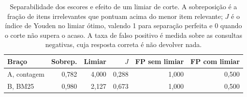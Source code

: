 \begin{table}[htb]
\centering
\caption{Separabilidade dos escores e efeito de um limiar de corte. A sobreposição é a fração de itens irrelevantes que pontuam acima do menor item relevante; $J$ é o índice de Youden no limiar ótimo, valendo 1 para separação perfeita e 0 quando o corte não supera o acaso. A taxa de falso positivo é medida sobre as consultas negativas, cuja resposta correta é não devolver nada.}
\label{tab:threshold}
\begin{tabular}{lrrrrr}
\toprule
Braço & Sobrep. & Limiar & $J$ & FP sem limiar & FP com limiar \\
\midrule
A, contagem & 0{,}782 & 4{,}000 & 0{,}288 & 1{,}000 & 0{,}500 \\
B, BM25 & 0{,}980 & 2{,}127 & 0{,}673 & 1{,}000 & 0{,}500 \\
\bottomrule
\end{tabular}
\end{table}
